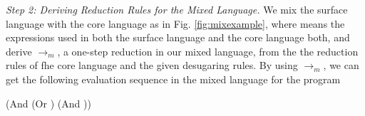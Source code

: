{\em Step 2: Deriving Reduction Rules for the Mixed Language.}
We mix the surface language with the core language as in Fig. \ref{fig:mixexample}, where  means the expressions used in both the surface language and the core language both, and derive $\to_m$, a one-step reduction in our mixed language, from the the reduction rules of fhe core language and the given desugaring rules. By using $\to_m$, we can get the following evaluation sequence in the mixed language for
the program 

{\footnotesize
\begin{Codes}
    (And (Or \true \false) (And \false \true))
\OneStep{ \false}
\end{Codes}
}


